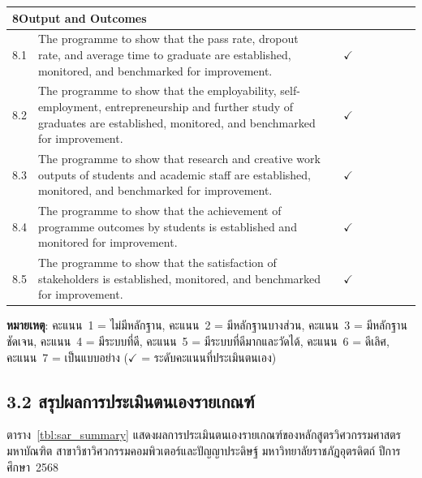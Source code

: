 \begin{longtable}{|p{0.6cm}|>{\raggedright\arraybackslash}p{9.2cm}|c|c|c|c|c|c|c|}
  \multicolumn{9}{|l|}{\cellcolor{gray!15}\textbf{8\quad Output and Outcomes}} \\
  \hline
  8.1 & The programme to show that the pass rate, dropout rate, and average time to graduate are established, monitored, and benchmarked for improvement. & & $\checkmark$ & & & & & \\
  \hline
  8.2 & The programme to show that the employability, self-employment, entrepreneurship and further study of graduates are established, monitored, and benchmarked for improvement. & & $\checkmark$ & & & & & \\
  \hline
  8.3 & The programme to show that research and creative work outputs of students and academic staff are established, monitored, and benchmarked for improvement. & & $\checkmark$ & & & & & \\
  \hline
  8.4 & The programme to show that the achievement of programme outcomes by students is established and monitored for improvement. & & $\checkmark$ & & & & & \\
  \hline
  8.5 & The programme to show that the satisfaction of stakeholders is established, monitored, and benchmarked for improvement. & & $\checkmark$ & & & & & \\
  \hline
\end{longtable}
\endgroup

\begin{flushleft}
  \scriptsize \textbf{หมายเหตุ}: คะแนน~1 = ไม่มีหลักฐาน, คะแนน~2 = มีหลักฐานบางส่วน, คะแนน~3 = มีหลักฐานชัดเจน, คะแนน~4 = มีระบบที่ดี, คะแนน~5 = มีระบบที่ดีมากและวัดได้, คะแนน~6 = ดีเลิศ, คะแนน~7 = เป็นแบบอย่าง ($\checkmark$ = ระดับคะแนนที่ประเมินตนเอง)
\end{flushleft}

\subsection*{3.2 สรุปผลการประเมินตนเองรายเกณฑ์}

ตาราง~\ref{tbl:sar_summary} แสดงผลการประเมินตนเองรายเกณฑ์ของหลักสูตรวิศวกรรมศาสตรมหาบัณฑิต สาขาวิชาวิศวกรรมคอมพิวเตอร์และปัญญาประดิษฐ์ มหาวิทยาลัยราชภัฏอุตรดิตถ์ ปีการศึกษา~2568


